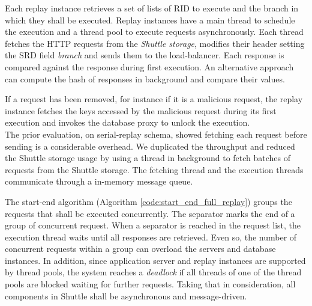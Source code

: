 Each replay instance retrieves a set of lists of \ac{RID} to execute and the branch in which they shall be executed. Replay instances have a main thread to schedule the execution and a thread pool to execute requests asynchronously. Each thread fetches the \acs{HTTP} requests from the \emph{Shuttle storage}, modifies their header setting the \ac{SRD} field \emph{branch} and sends them to the load-balancer. Each response is compared against the response during first execution. An alternative approach can compute the hash of responses in background and compare their values.

If a request has been removed, for instance if it is a malicious request, the replay instance fetches the keys accessed by the malicious request during its first execution and invokes the database proxy to unlock the execution.\\ %

The prior evaluation, on serial-replay schema, showed fetching each request before sending is a considerable overhead. We duplicated the throughput and reduced the Shuttle storage usage by using a thread in background to fetch batches of requests from the Shuttle storage. The fetching thread and the execution threads communicate through a in-memory message queue.

The start-end algorithm (Algorithm \ref{code:start_end_full_replay}) groups the requests that shall be executed concurrently. The separator marks the end of a group of concurrent request. When a separator is reached in the request list, the execution thread waits until all responses are retrieved. Even so, the number of concurrent requests within a group can overload the servers and database instances. In addition, since application server and replay instances are supported by thread pools, the system reaches a \emph{deadlock} if all threads of one of the thread pools are blocked waiting for further requests. Taking that in consideration, all components in Shuttle shall be asynchronous and message-driven.


